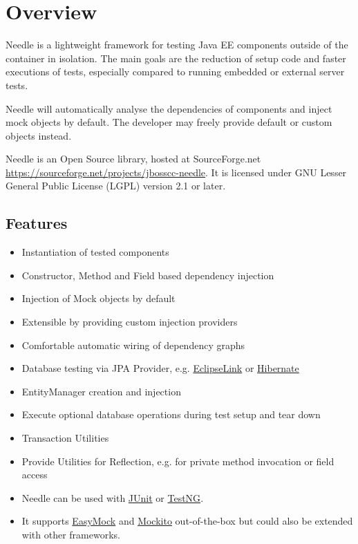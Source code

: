 \chapter{Overview}

Needle is a lightweight framework for testing Java EE components outside of the
container in isolation. The main goals are the reduction of setup code
and faster executions of tests, especially compared to running embedded or external server tests.

Needle will automatically analyse the dependencies of components and inject
mock objects by default. The developer may freely provide default or custom objects instead.

\parindent 0pt
Needle is an Open Source library, hosted at SourceForge.net \url{https://sourceforge.net/projects/jbosscc-needle}.
It is licensed under GNU Lesser General Public License (LGPL) version 2.1 or later.
	
\section{Features}
\begin{itemize}
	\item Instantiation of tested components
	\item Constructor, Method and Field based dependency injection
	\item Injection of Mock objects by default
	\item Extensible by providing custom injection providers
	\item Comfortable automatic wiring of dependency graphs

	\item Database testing via JPA Provider, e.g. \href{http://www.eclipse.org/eclipselink/}{EclipseLink} or \href{http://www.hibernate.org}{Hibernate}
	\item EntityManager creation and injection
	\item Execute optional database operations during test setup and tear down
	\item Transaction Utilities

	\item Provide Utilities for Reflection, e.g. for private method invocation or field access

	\item Needle can be used with \href{http://www.junit.org}{JUnit} or \href{http://testng.org/}{TestNG}.
	\item It supports \href{http://www.easymock.org/}{EasyMock} and \href{http://code.google.com/p/mockito/}{Mockito} out-of-the-box but could also be extended with other frameworks.
\end{itemize}

